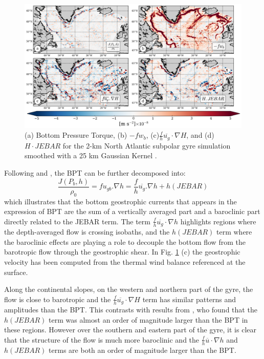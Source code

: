\documentclass[os, manuscript]{copernicus}
\begin{document}
\begin{figure}[t]
\includegraphics[width=15cm]{../fig_os/f08.pdf}
\caption{(a) Bottom Pressure Torque, (b) $-fw_b$, (c)$\frac{f}{h} \overline{u_g} \cdot \nabla H$, and (d) $H \cdot JEBAR$ for the 2-km North Atlantic subpolar gyre simulation smoothed with a 25 km Gaussian Kernel .}
\label{f08}
\end{figure} 

Following \citet{mertz1992} and \citet{yeager2015}, the BPT can be further decomposed into:
\begin{equation}
\frac{J(P_b,h)}{\rho _0}=f u_{gb}.\nabla h = \frac{f}{h} \overline{u_g}.\nabla h +  h(JEBAR)
\end{equation}
which illustrates that the bottom geostrophic currents that appears in the expression of BPT are the sum of a vertically averaged part and a baroclinic part directly related to the JEBAR term. The term $ \frac{f}{h} \overline{u_g} \cdot \nabla h$ highlights regions where the depth-averaged flow is crossing isobaths, and the $h(JEBAR)$ term where the baroclinic effects are playing a role to decouple the bottom flow from the barotropic flow through the geostrophic shear. In Fig. \ref{f08} (c) the geostrophic velocity has been computed from the thermal wind balance referenced at the surface.

Along the continental slopes, on the western and northern part of the gyre, the flow is close to barotropic and the $ \frac{f}{h} \overline{u_g} \cdot \nabla H$ term has similar patterns and amplitudes than the BPT. This contrasts with results from \citet{yeager2015}, who found that the $h(JEBAR)$ term was almost an order of magnitude larger than the BPT in these regions. However over the southern and eastern part of the gyre, it is clear that the structure of the flow is much more baroclinic and the $ \frac{f}{h} \overline{u} \cdot \nabla h$ and  $h(JEBAR)$ terms are both an order of magnitude larger than the BPT.
\end{document}
